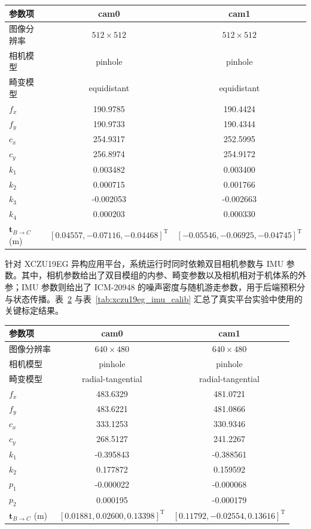 \begin{table}[!t]
\centering
{}
\label{tab:tumvi_calib}
\scriptsize
\begin{tabular}{lcc}
\toprule
参数项 & cam0 & cam1 \\
\midrule
图像分辨率 & $512 \times 512$ & $512 \times 512$ \\
相机模型 & pinhole & pinhole \\
畸变模型 & equidistant & equidistant \\
$f_x$ & 190.9785 & 190.4424 \\
$f_y$ & 190.9733 & 190.4344 \\
$c_x$ & 254.9317 & 252.5995 \\
$c_y$ & 256.8974 & 254.9172 \\
$k_1$ & 0.003482 & 0.003400 \\
$k_2$ & 0.000715 & 0.001766 \\
$k_3$ & -0.002053 & -0.002663 \\
$k_4$ & 0.000203 & 0.000330 \\
$\mathbf{t}_{B\rightarrow C}$ (m) & $[0.04557, -0.07116, -0.04468]^\mathrm{T}$ & $[-0.05546, -0.06925, -0.04745]^\mathrm{T}$ \\
\bottomrule
\end{tabular}
\end{table}

针对 XCZU19EG 异构应用平台，系统运行时同时依赖双目相机参数与 IMU 参数。其中，相机参数给出了双目模组的内参、畸变参数以及相机相对于机体系的外参；IMU 参数则给出了 ICM-20948 的噪声密度与随机游走参数，用于后端预积分与状态传播。表~\ref{tab:xczu19eg_camera_calib} 与表~\ref{tab:xczu19eg_imu_calib} 汇总了真实平台实验中使用的关键标定结果。

\begin{table}[!t]
\centering
{}
\label{tab:xczu19eg_camera_calib}
\scriptsize
\begin{tabular}{lcc}
\toprule
参数项 & cam0 & cam1 \\
\midrule
图像分辨率 & $640 \times 480$ & $640 \times 480$ \\
相机模型 & pinhole & pinhole \\
畸变模型 & radial-tangential & radial-tangential \\
$f_x$ & 483.6329 & 481.0721 \\
$f_y$ & 483.6221 & 481.0866 \\
$c_x$ & 333.1253 & 330.9346 \\
$c_y$ & 268.5127 & 241.2267 \\
$k_1$ & -0.395843 & -0.388561 \\
$k_2$ & 0.177872 & 0.159592 \\
$p_1$ & -0.000022 & -0.000068 \\
$p_2$ & 0.000195 & -0.000179 \\
$\mathbf{t}_{B\rightarrow C}$ (m) & $[0.01881, 0.02600, 0.13398]^\mathrm{T}$ & $[0.11792, -0.02554, 0.13616]^\mathrm{T}$ \\
\bottomrule
\end{tabular}
\end{table}

